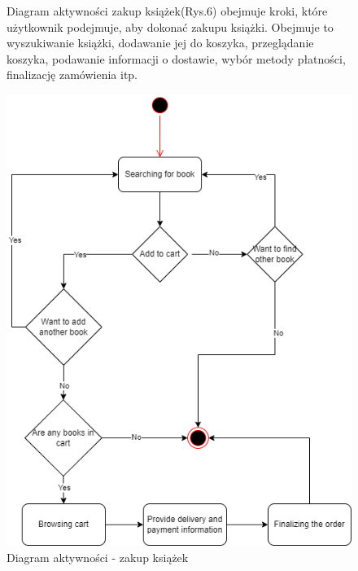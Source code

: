 \documentclass[]{article}
\begin{document}
\begin{figure}[ht]
	\begin{minipage}{\textwidth}
		Diagram aktywności zakup książek(Rys.6) obejmuje kroki, które użytkownik podejmuje, aby dokonać zakupu książki. Obejmuje to wyszukiwanie książki, dodawanie jej do koszyka, przeglądanie koszyka, podawanie informacji o dostawie, wybór metody płatności, finalizację zamówienia itp.
	\end{minipage}
	\vspace{15pt}
	
	\centering
	\includegraphics[scale=0.50]{zakup_ks.png}
	\caption{Diagram aktywności - zakup książek}
\end{figure}
\end{document}
